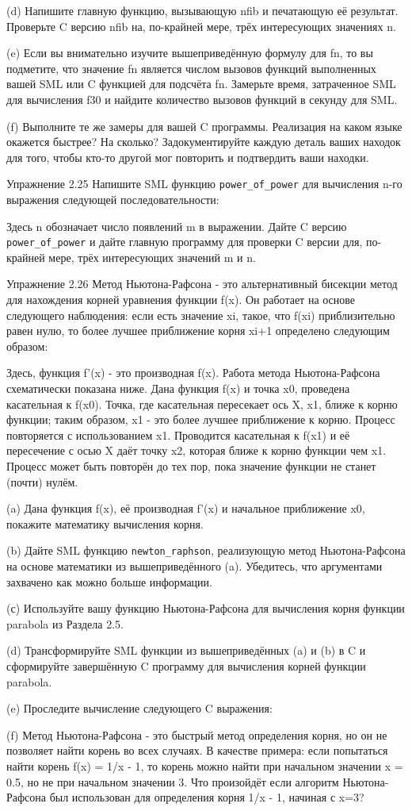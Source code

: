 (d) Напишите главную функцию, вызывающую nfib и печатающую её результат. Проверьте C версию nfib на, по-крайней мере, трёх интересующих значениях n.

(e) Если вы внимательно изучите вышеприведённую формулу для fn, то вы подметите, что значение fn является числом вызовов функций выполненных вашей SML или C функцией для подсчёта fn. Замерьте время, затраченное SML для вычисления f30 и найдите количество вызовов функций в секунду для SML.

(f) Выполните те же замеры для вашей C программы. Реализация на каком языке окажется быстрее? На сколько? Задокументируйте каждую деталь ваших находок для того, чтобы кто-то другой мог повторить и подтвердить ваши находки.

Упражнение 2.25 Напишите SML функцию \lstinline|power_of_power| для вычисления n-го выражения следующей последовательности:

Здесь n обозначает число появлений m в выражении. Дайте C версию \lstinline|power_of_power| и дайте главную программу для проверки C версии для, по-крайней мере, трёх интересующих значений m и n.

Упражнение 2.26 Метод Ньютона-Рафсона - это альтернативный бисекции метод для нахождения корней уравнения функции f(x). Он работает на основе следующего наблюдения: если есть значение xi, такое, что f(xi) приблизительно равен нулю, то более лучшее приближение корня xi+1 определено следующим образом:

Здесь, функция f'(x) - это производная f(x). Работа метода Ньютона-Рафсона схематически показана ниже. Дана функция f(x) и точка x0, проведена касательная к f(x0). Точка, где касательная пересекает ось X, x1, ближе к корню функции; таким образом, x1 - это более лучшее приближение к корню. Процесс повторяется с использованием x1. Проводится касательная к f(x1) и её пересечение с осью X даёт точку x2, которая ближе к корню функции чем x1. Процесс может быть повторён до тех пор, пока значение функции не станет (почти) нулём.

(a) Дана функция f(x), её производная f'(x) и начальное приближение x0, покажите математику вычисления корня.

(b) Дайте SML функцию \lstinline|newton_raphson|, реализующую метод Ньютона-Рафсона на основе математики из вышеприведённого (a). Убедитесь, что аргументами захвачено как можно больше информации.

(с) Используйте вашу функцию Ньютона-Рафсона для вычисления корня функции parabola из Раздела 2.5.

(d) Трансформируйте SML функции из вышеприведённых (a) и (b) в C и сформируйте завершённую C программу для вычисления корней функции parabola.

(e) Проследите вычисление следующего C выражения:

(f) Метод Ньютона-Рафсона - это быстрый метод определения корня, но он не позволяет найти корень во всех случаях. В качестве примера: если попытаться найти корень f(x) = 1/x - 1, то корень можно найти при начальном значении x = 0.5, но не при начальном значении 3. Что произойдёт если алгоритм Ньютона-Рафсона был использован для определения корня 1/x - 1, начиная с x=3?

